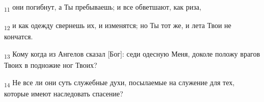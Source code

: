 \begin{tcolorbox}
\textsubscript{11} они погибнут, а Ты пребываешь; и все обветшают, как риза,
\end{tcolorbox}
\begin{tcolorbox}
\textsubscript{12} и как одежду свернешь их, и изменятся; но Ты тот же, и лета Твои не кончатся.
\end{tcolorbox}
\begin{tcolorbox}
\textsubscript{13} Кому когда из Ангелов сказал [Бог]: седи одесную Меня, доколе положу врагов Твоих в подножие ног Твоих?
\end{tcolorbox}
\begin{tcolorbox}
\textsubscript{14} Не все ли они суть служебные духи, посылаемые на служение для тех, которые имеют наследовать спасение?
\end{tcolorbox}
